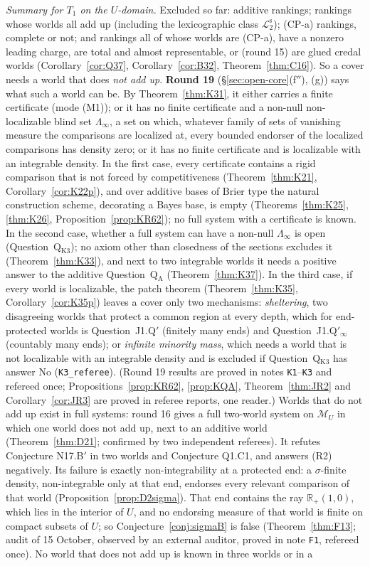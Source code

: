 \documentclass[11pt]{article}
\theoremstyle{definition}
\theoremstyle{remark}
\newcommand{\R}{\mathbb R}
\newcommand{\M}{\mathcal M}
\newcommand{\src}[1]{\texttt{#1}}
\newcommand{\Ltwo}{\mathcal L_2^{\mathrm s}}
\begin{document}
\emph{Summary for $T_1$ on the $U$-domain.} Excluded so far: additive rankings; rankings whose worlds all add up (including the lexicographic class $\Ltwo$); (CP-a) rankings, complete or not; and rankings all of whose worlds are (CP-a), have a nonzero leading charge, are total and almost representable, or (round 15) are glued credal worlds (Corollary~\ref{cor:Q37}, Corollary~\ref{cor:B32}, Theorem~\ref{thm:C16}). So a cover needs a world that does \emph{not add up}. \textbf{Round 19} (\S\ref{sec:open-core}(f$''$), (g)) says what such a world can be. By Theorem~\ref{thm:K31}, it either carries a finite certificate (mode (M1)); or it has no finite certificate and a non-null non-localizable blind set $\Lambda_\infty$, a set on which, whatever family of sets of vanishing measure the comparisons are localized at, every bounded endorser of the localized comparisons has density zero; or it has no finite certificate and is localizable with an integrable density. In the first case, every certificate contains a rigid comparison that is not forced by competitiveness (Theorem~\ref{thm:K21}, Corollary~\ref{cor:K22p}), and over additive bases of Brier type the natural construction scheme, decorating a Bayes base, is empty (Theorems~\ref{thm:K25}, \ref{thm:K26}, Proposition~\ref{prop:KR62}); no full system with a certificate is known. In the second case, whether a full system can have a non-null $\Lambda_\infty$ is open (Question~Q$_{\mathrm{K3}}$); no axiom other than closedness of the sections excludes it (Theorem~\ref{thm:K33}), and next to two integrable worlds it needs a positive answer to the additive Question~Q$_{\mathrm A}$ (Theorem~\ref{thm:K37}). In the third case, if every world is localizable, the patch theorem (Theorem~\ref{thm:K35}, Corollary~\ref{cor:K35p}) leaves a cover only two mechanisms: \emph{sheltering}, two disagreeing worlds that protect a common region at every depth, which for end-protected worlds is Question~J1.Q$'$ (finitely many ends) and Question~J1.Q$'_\infty$ (countably many ends); or \emph{infinite minority mass}, which needs a world that is not localizable with an integrable density and is excluded if Question~Q$_{\mathrm{K3}}$ has answer No (\src{K3\_referee}). (Round 19 results are proved in notes \src{K1}--\src{K3} and refereed once; Propositions~\ref{prop:KR62}, \ref{prop:KQA}, Theorem~\ref{thm:JR2} and Corollary~\ref{cor:JR3} are proved in referee reports, one reader.) Worlds that do not add up exist in full systems: round 16 gives a full two-world system on $\M_U$ in which one world does not add up, next to an additive world (Theorem~\ref{thm:D21}; confirmed by two independent referees). It refutes Conjecture N17.B$'$ in two worlds and Conjecture Q1.C1, and answers (R2) negatively. Its failure is exactly non-integrability at a protected end: a $\sigma$-finite density, non-integrable only at that end, endorses every relevant comparison of that world (Proposition~\ref{prop:D2sigma}). That end contains the ray $\R_+(1,0)$, which lies in the interior of $U$, and no endorsing measure of that world is finite on compact subsets of $U$; so Conjecture~\ref{conj:sigmaB} is false (Theorem~\ref{thm:F13}; audit of 15 October, observed by an external auditor, proved in note \src{F1}, refereed once). No world that does not add up is known in three worlds or in a 
\end{document}
